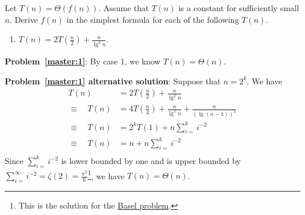 \begin{Exercise}
Let $T(n) = \Theta(f(n))$. Assume that $T(n)$ is a constant for sufficiently small $n$. Derive $f(n)$ in the simplest formula for each of the following $T(n)$.
\begin{enumerate}
\item $T(n) = 2T(\frac{n}{2}) + \frac{n}{\lg^2 n}$. \label{master:1} \school{[NCTU CS 104]}
\end{enumerate}
\end{Exercise}
\begin{Answer}

{\bf Problem~\ref{master:1}}: By case 1, we know $T(n) = \Theta(n)$.

{\bf Problem~\ref{master:1} alternative solution}: Suppose that $n = 2^k$. We have
\begin{align*}
T(n) &= 2T(\frac{n}{2}) + \frac{n}{\lg^2 n} \\
\equiv \quad T(n) &= 4T(\frac{n}{4}) + \frac{n}{\lg^2 n} + \frac{n}{(\lg (n-1))^2} \\
\equiv \quad T(n) &= 2^k T(1) + n \sum_{i=}^k i^{-2} \\
\equiv \quad T(n) &= n + n \sum_{i=}^k i^{-2} \\
\end{align*}
Since $\sum_{i=}^k i^{-2}$ is lower bounded by one and is upper bounded by $\sum_{i=}^{\infty} i^{-2} = \zeta(2) = \frac{\pi^2}{6}$\footnote{This is the solution for the \href{https://en.wikipedia.org/wiki/Basel_problem}{Basel problem}.}, we have $T(n) = \Theta(n)$.
\end{Answer}

